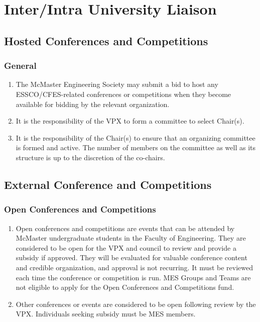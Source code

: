\section{Inter/Intra University Liaison}
\label{interintra-university-liaison}

\subsection{Hosted Conferences and Competitions}
\label{hosted-conferences-and-competitions}

\subsubsection{General}
\label{conferences-general}

\begin{enumerate}
 \item
  The McMaster Engineering Society may submit a bid to host any
  ESSCO/CFES-related conferences or competitions when they become
  available for bidding by the relevant organization.
 \item
  It is the responsibility of the VPX to form a committee to select
  Chair(s).
 \item
  It is the responsibility of the Chair(s) to ensure that an organizing
  committee is formed and active. The number of members on the committee
  as well as its structure is up to the discretion of the co-chairs.

\end{enumerate}

\subsection{External Conference and Competitions}
\label{external-conference-and-competitions}

\subsubsection{Open Conferences and Competitions}
\label{open-conferences-and-competitions}

\begin{enumerate}
 \item
  Open conferences and competitions are events that can be attended by
  McMaster undergraduate students in the Faculty of Engineering. They
  are considered to be open for the VPX and council to review and
  provide a subsidy if approved. They will be evaluated for valuable
  conference content and credible organization, and approval is not
  recurring. It must be reviewed each time the conference or competition
  is run. MES Groups and Teams are not eligible to apply for the Open
  Conferences and Competitions fund.
 \item
  Other conferences or events are considered to be open following review
  by the VPX. Individuals seeking subsidy must be MES members.

\end{enumerate}

